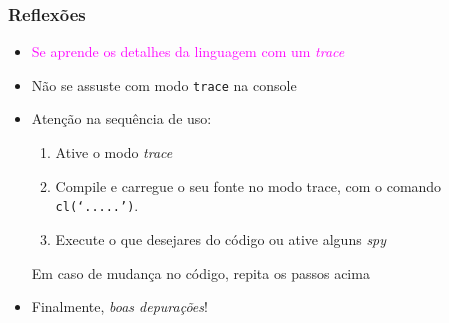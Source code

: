 \begin{frame}[fragile]
\frametitle{Reflexões}

\begin{itemize}
  \item \textcolor{magenta}{Se aprende os detalhes da linguagem com um \textit{trace}}
  
  \pause
    \item Não se assuste com modo \texttt{trace} na console
  
  
  \pause
    \item Atenção na sequência de uso: 
    
    \begin{enumerate}
      \item Ative o modo \textit{trace}
      \item Compile e carregue o seu fonte no modo trace, com o comando \texttt{cl(`.....')}.
      \item Execute o que desejares do código ou ative alguns \textit{spy}
    \end{enumerate}
    \pause
    Em caso de mudança no código, repita os passos acima
    
\pause
    \item Finalmente, \textit{boas depurações}!        
  
\end{itemize}


\end{frame}
